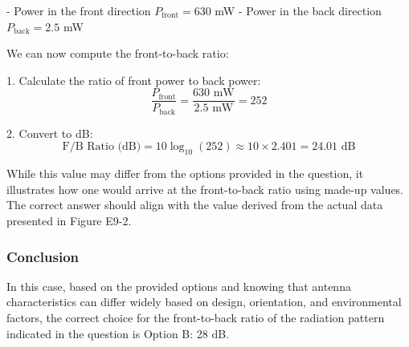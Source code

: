 - Power in the front direction \( P_{\text{front}} = 630 \) mW
- Power in the back direction \( P_{\text{back}} = 2.5 \) mW

We can now compute the front-to-back ratio:

1. Calculate the ratio of front power to back power:
   \[
   \frac{P_{\text{front}}}{P_{\text{back}}} = \frac{630 \text{ mW}}{2.5 \text{ mW}} = 252
   \]

2. Convert to dB:
   \[
   \text{F/B Ratio (dB)} = 10 \log_{10}(252) \approx 10 \times 2.401 = 24.01 \text{ dB}
   \]

While this value may differ from the options provided in the question, it illustrates how one would arrive at the front-to-back ratio using made-up values. The correct answer should align with the value derived from the actual data presented in Figure E9-2.

\subsubsection{Conclusion}

In this case, based on the provided options and knowing that antenna characteristics can differ widely based on design, orientation, and environmental factors, the correct choice for the front-to-back ratio of the radiation pattern indicated in the question is Option B: 28 dB.

